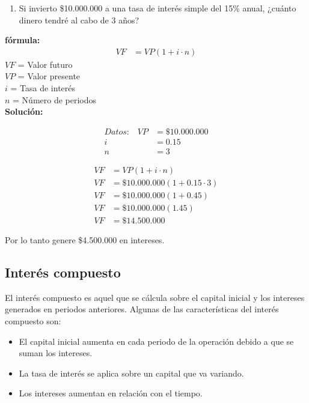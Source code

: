 \documentclass{templateNote}
\begin{document}
\begin{tcolorbox}[colback=blue!10!white,colframe=blue!60!black,title=Ejemplo]
    \begin{enumerate}
        \item Si invierto \$10.000.000 a una tasa de interés simple del 15\% anual, ¿cuánto dinero tendré al cabo de 3 años?
    \end{enumerate}
    \textbf{fórmula:}
    \begin{align*}
        VF &= VP(1 + i \cdot n)
    \end{align*}
    $VF$ = Valor futuro\\
    $VP$ = Valor presente\\
    $i$ = Tasa de interés\\
    $n$ = Número de periodos\\
    \textbf{Solución:}\\
    \begin{minipage}{0.5\textwidth}
        \begin{align*}
            \textit{Datos:} \quad
            VP &= \$10.000.000\\
            i &= 0.15\\
            n &= 3
        \end{align*}
    \end{minipage}
    \begin{minipage}{0.5\textwidth}
        \begin{align*}
            VF &= VP(1 + i \cdot n)\\
            VF &= \$10.000.000(1 + 0.15 \cdot 3)\\
            VF &= \$10.000.000(1 + 0.45)\\
            VF &= \$10.000.000(1.45)\\
            VF &= \$14.500.000
        \end{align*}
    \end{minipage}
    \center Por lo tanto genere \$4.500.000 en intereses.
\end{tcolorbox}


\subsection{Interés compuesto}
\noindent El interés compuesto es aquel que se cálcula sobre el capital inicial y los intereses generados en periodos anteriores. Algunas de las características del interés compuesto son:
\begin{itemize}
    \item El capital inicial aumenta en cada periodo de la operación debido a que se suman los intereses.
    \item La tasa de interés se aplica sobre un capital que va variando.
    \item Los intereses aumentan en relación con el tiempo.
\end{itemize}
\end{document}
